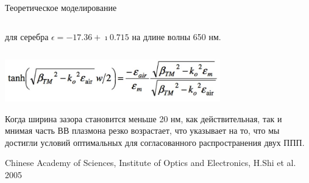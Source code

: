 \documentclass[9pt, compress, xcolor=table]{beamer}
\begin{document}
\begin{frame}{Теоретическое моделирование}
\begin{columns}[c]
\begin{center}
{\tiny для серебра $\epsilon=-17.36+\imath 0.715$ на длине волны 650 нм.}
\end{center}
\end{columns}

\begin{center}
\includegraphics[width=0.7\textwidth]{ns0a}
\end{center}

Когда ширина зазора становится меньше 20 нм, как действительная, так и мнимая часть ВВ плазмона резко возрастает, что указывает на то, что мы достигли условий оптимальных для согласованного распространения двух ППП.

{\tiny Chinese Academy of Sciences, Institute of Optics and Electronics, H.Shi et al. 2005}
\end{frame}
\end{document}
